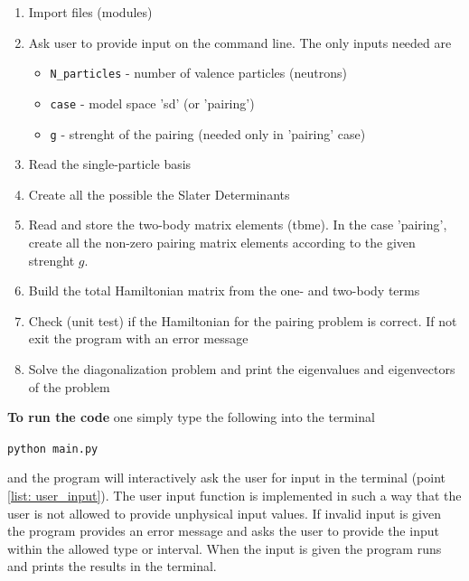 \documentclass[twoside]{article}
\begin{document}
\begin{tcolorbox}
\begin{enumerate}
\item Import files (modules)
\item Ask user to provide input on the command line. The only inputs needed are \label{list: user_input}
\begin{itemize}
\item \texttt{N\_particles} - number of valence particles (neutrons) 
\item \texttt{case} - model space 'sd' (or 'pairing')
\item \texttt{g} - strenght of the pairing (needed only in 'pairing' case)
\end{itemize}
\item Read the single-particle basis \label{list: sp}
\item Create all the possible the Slater Determinants \label{list: SD}
\item Read and store the two-body matrix elements (tbme). In the case 'pairing', create all the non-zero pairing matrix elements according to the given strenght $g$. \label{list: tbme}
\item Build the total Hamiltonian matrix from the one- and two-body terms \label{list: build_ham}
\item Check (unit test) if the Hamiltonian for the pairing problem is correct. If not exit the program with an error message \label{list: unit_test}
\item Solve the diagonalization problem and print the eigenvalues and eigenvectors of the problem \label{list: diag_eigval_vec}
\end{enumerate}
\end{tcolorbox}


\smallskip

\noindent \textbf{To run the code} one simply type the following into the terminal
\begin{center}\texttt{python main.py}\end{center} 
and the program will interactively ask the user for input in the terminal (point \ref{list: user_input}). The user input function is implemented in such a way that the user is not allowed to provide unphysical input values. If invalid input is given the program provides an error message and asks the user to provide the input within the allowed type or interval. When the input is given the program runs and prints the results in the terminal.
\end{document}
